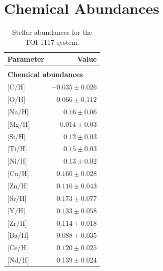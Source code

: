 \documentclass[fleqn,usenatbib,useAMS]{mnras}
\begin{document}
\section{Chemical Abundances}
\begin{table}
 \caption{Stellar abundances for the TOI-1117 system.}
 \label{table A1}
  \begin{tabular}{lr}
   \hline
   Parameter & Value \\
   \hline
   \\\multicolumn{2}{l}{\textbf{Chemical abundances}} \\
   {[}C/H{]} & $-0.035\pm0.026$\\
   {[}O/H{]} & $0.066\pm0.112$\\
   {[}Na/H{]} & $0.16\pm0.06$\\
   {[}Mg/H{]} & $0.014\pm0.03$\\
   {[}Si/H{]} & $0.12\pm0.03$\\
   {[}Ti/H{]} & $0.15\pm0.03$\\
   {[}Ni/H{]} & $0.13\pm0.02$\\
   {[}Cu/H{]} & $0.160\pm0.028$\\
   {[}Zn/H{]} & $0.110\pm0.043$\\
   {[}Sr/H{]} & $0.173\pm0.077$\\
   {[}Y/H{]} & $0.133\pm0.058$\\
   {[}Zr/H{]} & $0.114\pm0.018$\\
   {[}Ba/H{]} & $0.088\pm0.035$\\
   {[}Ce/H{]} & $0.120\pm0.025$\\
   {[}Nd/H{]} & $0.139\pm0.024$\\
   \hline
  \end{tabular}
\end{table}
\end{document}
